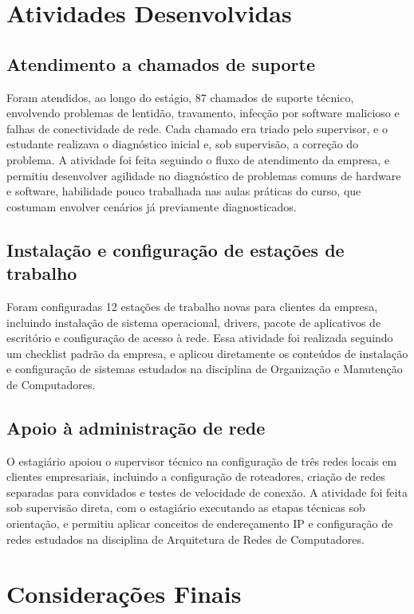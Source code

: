 \documentclass[article,12pt,a4paper]{abntex2}
\begin{document}
\section{Atividades Desenvolvidas}

\subsection{Atendimento a chamados de suporte}

Foram atendidos, ao longo do estágio, 87 chamados de suporte técnico,
envolvendo problemas de lentidão, travamento, infecção por software
malicioso e falhas de conectividade de rede. Cada chamado era triado pelo
supervisor, e o estudante realizava o diagnóstico inicial e, sob
supervisão, a correção do problema. A atividade foi feita seguindo o
fluxo de atendimento da empresa, e permitiu desenvolver agilidade no
diagnóstico de problemas comuns de hardware e software, habilidade pouco
trabalhada nas aulas práticas do curso, que costumam envolver cenários já
previamente diagnosticados.

\subsection{Instalação e configuração de estações de trabalho}

Foram configuradas 12 estações de trabalho novas para clientes da empresa,
incluindo instalação de sistema operacional, drivers, pacote de
aplicativos de escritório e configuração de acesso à rede. Essa atividade
foi realizada seguindo um checklist padrão da empresa, e aplicou
diretamente os conteúdos de instalação e configuração de sistemas
estudados na disciplina de Organização e Manutenção de Computadores.

\subsection{Apoio à administração de rede}

O estagiário apoiou o supervisor técnico na configuração de três redes
locais em clientes empresariais, incluindo a configuração de roteadores,
criação de redes separadas para convidados e testes de velocidade de
conexão. A atividade foi feita sob supervisão direta, com o estagiário
executando as etapas técnicas sob orientação, e permitiu aplicar
conceitos de endereçamento IP e configuração de redes estudados na
disciplina de Arquitetura de Redes de Computadores.

\section{Considerações Finais}
\end{document}
